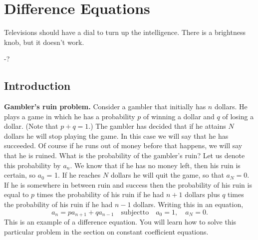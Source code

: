 \flushbottom




\chapter{Difference Equations}

Televisions should have a dial to turn up the intelligence.  There is a 
brightness knob, but it doesn't work.

\begin{flushright}
  -?
\end{flushright}



\section{Introduction}
\begin{Example}
  \label{gambler's-ruin-intro}
  \textbf{Gambler's ruin problem.}
  Consider a gambler that initially has $n$ dollars.  He plays a game in which
  he has a probability $p$ of winning a dollar and $q$ of losing a dollar.
  (Note that $p + q = 1$.)
  The gambler has decided that if he attains $N$ dollars he will stop playing
  the game.  In this case we will say that he has succeeded.  Of course if he 
  runs out of money before that happens, we will say that he is ruined.  What is
  the probability of the gambler's ruin?  Let us denote this probability by
  $a_n$.  We know that if he has no money left, then his ruin is certain, so 
  $a_0$ = 1.  If he reaches $N$ dollars he will quit the game, so that
  $a_N = 0$.  If he is somewhere in between ruin and success then the probability
  of his ruin is equal to $p$ times the probability of his ruin if he had
  $n+1$ dollars plus $q$ times the probability of his ruin if he had
  $n-1$ dollars.  Writing this in an equation,
  \[ a_n = pa_{n+1} + q a_{n-1} \quad \mathrm{subject to}\quad a_0=1, \quad
  a_N = 0.\]
  This is an example of a difference equation.  You will learn how to solve this
  particular problem in the section on constant coefficient equations.
\end{Example}




